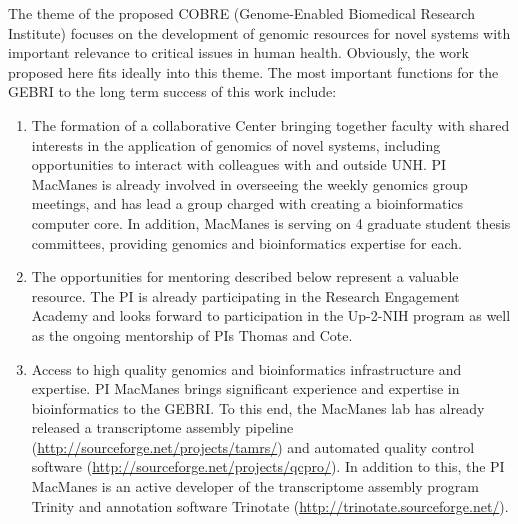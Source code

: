\documentclass[11pt]{article}
\begin{document}


The theme of the proposed COBRE (Genome-Enabled Biomedical Research Institute) focuses on the development of genomic resources for novel systems with important relevance to critical issues in human health. Obviously, the work proposed here fits ideally into this theme.  The most important functions for the GEBRI to the long term success of this work include: 

\begin{enumerate}
\item The formation of a collaborative Center bringing together faculty with shared interests in the application of genomics of novel systems, including opportunities to interact with colleagues with and outside UNH.   PI MacManes is already involved in overseeing the weekly genomics group meetings, and has lead a group charged with creating a bioinformatics computer core.  In addition, MacManes is serving on 4 graduate student thesis committees, providing genomics and bioinformatics expertise for each. 

\item The opportunities for mentoring described below represent a valuable resource.  The PI is already participating in the Research Engagement Academy and looks forward to participation in the Up-2-NIH program as well as the ongoing mentorship of PIs Thomas and Cote.

\item	Access to high quality genomics and bioinformatics infrastructure and expertise.  PI MacManes brings significant experience and expertise in bioinformatics to the GEBRI. To this end, the MacManes lab has already released a transcriptome assembly pipeline (\url{http://sourceforge.net/projects/tamrs/}) and automated quality control software (\url{http://sourceforge.net/projects/qcpro/}). In addition to this, the PI MacManes is an active developer of the transcriptome assembly program Trinity \citep{Haas:2013jq} and annotation software Trinotate (\url{http://trinotate.sourceforge.net/}). 

\end{enumerate}
\end{document}
